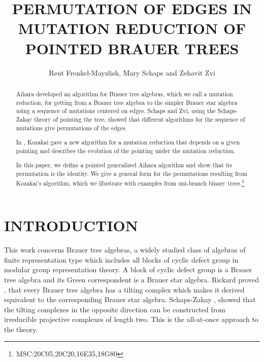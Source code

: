\documentclass[11pt,english]{article}
\numberwithin{figure}{section}
\numberwithin{equation}{section}
\numberwithin{table}{section}
\theoremstyle{definition}
\theoremstyle{remark}
\begin{document}
	
	\title{PERMUTATION OF EDGES IN MUTATION REDUCTION OF POINTED BRAUER TREES} 
	\author{Reut Frenkel-Mayzlish, Mary Schaps and Zehavit Zvi}
	
	\maketitle


\begin{abstract} 
	
	
	Aihara developed an algorithm for Brauer tree algebras, which we call a mutation reduction,  for getting from a Brauer tree algebra to the simpler Brauer star algebra using a sequence  of mutations centered on edges.  Schaps and Zvi, using the  
	Schaps-Zakay theory of pointing the tree, showed that different algorithms for the sequence of mutations give permutations of the edges. 
	
	In \cite{K}, Kozakai gave a new algorithm for a mutation reduction that depends on a given pointing and describes the evolution of the pointing under the mutation reduction.
	
	In this paper, we define a pointed generalized Aihara algorithm and show that its permutation is the identity.  We give a general form for the permutations resulting from Kozakai's algorithm, which we illustrate with examples from  uni-branch binary trees.\footnote{MSC:20C05,20C20,16E35,18G80}
	
	
\end{abstract}


\section{INTRODUCTION}

\noindent This work concerns Brauer tree algebras, a widely studied class of 
algebras of finite representation type which includes all  blocks of cyclic defect 
group in modular group representation
theory. A block of cyclic defect group is a Brauer 
tree algebra and its Green correspondent is a Brauer star algebra.
Rickard proved \cite{R1}, \cite{R2} that every Brauer tree algebra has a tilting complex which 
makes it derived equivalent to the corresponding Brauer star algebra.  
Schaps-Zakay \cite{SZ1}, \cite{SZ2} showed that the tilting complexes in the 
opposite direction can be constructed from irreducible 
projective complexes of length two.  This is the 
all-at-once approach to the theory.
\end{document}
